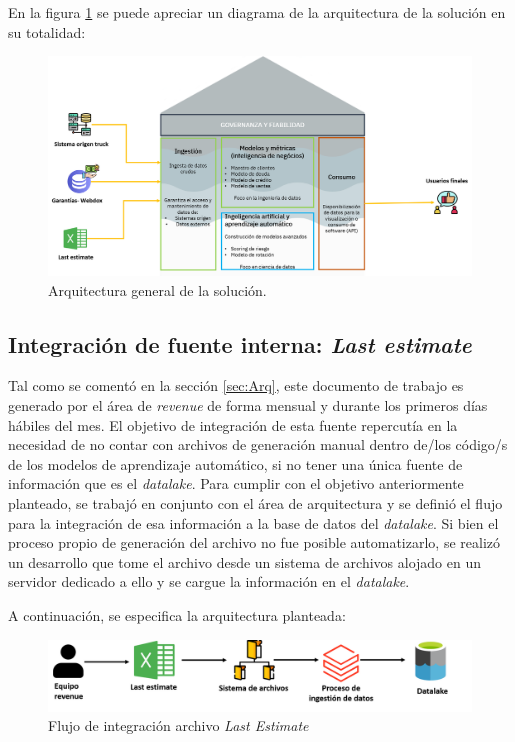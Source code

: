 En la figura \ref{fig:arqcompleta} se puede apreciar un diagrama de la arquitectura de la solución en su totalidad:

\vspace{1cm}
\begin{figure}[htbp]
	\centering
	\includegraphics[width=1.1\textwidth]{./Figures/arqcompleta.png}
	\caption{Arquitectura general de la solución.}
	\label{fig:arqcompleta}
\end{figure}
\vspace{1cm}


\subsection{Integración de fuente interna: \textit{Last estimate}}
Tal como se comentó en la sección \ref{sec:Arq}, este documento de trabajo es generado por el área de \textit{revenue} de forma mensual y durante los primeros días hábiles del mes.
El objetivo de integración de esta fuente repercutía en la necesidad de no contar con archivos de generación manual dentro de/los código/s de los modelos de aprendizaje automático, si no tener una única fuente de información que es el \textit{datalake}. 
Para cumplir con el objetivo anteriormente planteado, se trabajó en conjunto con el área de arquitectura y se definió el flujo para la integración de esa información a la base de datos del \textit{datalake}. 
Si bien el proceso propio de generación del archivo no fue posible automatizarlo, se realizó un desarrollo que tome el archivo desde un sistema de archivos alojado en un servidor dedicado a ello y se cargue la información en el \textit{datalake}. 

A continuación, se especifica la arquitectura planteada:

\vspace{1cm}
\begin{figure}[htbp]
	\centering
	\includegraphics[width=1.0\textwidth]{./Figures/LE.png}
	\caption{Flujo de integración archivo \textit{Last Estimate}}
	\label{fig:LE}
\end{figure}
\vspace{1cm}

